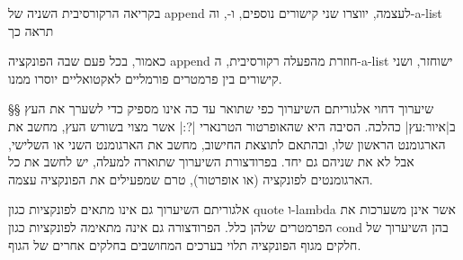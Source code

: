 בקריאה הרקורסיבית השניה של append לעצמה, יווצרו שני קישורים נוספים,
 ו-, וה-a-list תראה כך
\begin{LTR}
  \usetikzlibrary{chains,arrows}
\end{LTR}
כאמור, בכל פעם שבה הפונקציה append חוזרת מהפעלה רקורסיבית, ה-a-list ישוחזר,
ושני קישורים בין פרמטרים פורמליים לאקטואליים יוסרו ממנו.

§§ שיערוך דחוי
אלגוריתם השיערוך כפי שתואר עד כה אינו מספיק כדי לשערך את העץ ב|איור:עץ|
כהלכה. הסיבה היא שהאופרטור הטרנארי \T|?:| אשר מצוי בשורש העץ, מחשב את הארגומנט
הראשון שלו, ובהתאם לתוצאת החישוב, מחשב את הארגומנט השני או השלישי, אבל לא את
שניהם גם יחד. בפרודצורת השיערוך שתוארה למעלה, יש לחשב את כל הארגומנטים לפונקציה
(או אופרטור), טרם שמפעילים את הפונקציה עצמה.

אלגוריתם השיערוך גם אינו מתאים לפונקציות כגון quote ו-lambda אשר אינן משערכות
את הפרמטרים שלהן כלל. הפרודצורה גם אינה מתאימה לפונקציות כגון cond בהן השיערוך
של חלקים מגוף הפונקציה תלוי בערכים המחושבים בחלקים אחרים של הגוף.

